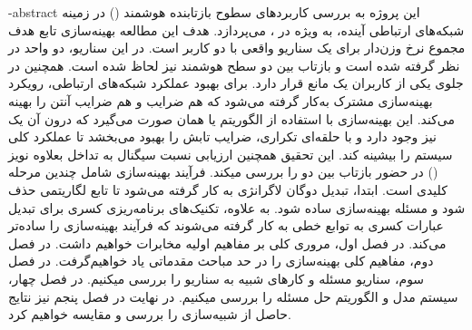 
\fa-abstract{
این پروژه به بررسی کاربرد‌های سطوح بازتابنده هوشمند () در زمینه شبکه‌های ارتباطی آینده، به ویژه در ، می‌پردازد. هدف این مطالعه بهینه‌سازی تابع هدف مجموع نرخ وزن‌دار برای یک سناریو واقعی با دو کاربر است. در این سناریو، دو واحد  در نظر گرفته شده است و بازتاب بین دو سطح هوشمند نیز لحاظ شده است. همچنین در جلوی یکی از کاربران یک مانع قرار دارد. برای بهبود عملکرد شبکه‌های ارتباطی، رویکرد بهینه‌سازی مشترک به‌کار گرفته می‌شود که هم ضرایب  و هم ضرایب آنتن را بهینه می‌کند. این بهینه‌سازی با استفاده از الگوریتم  یا همان  صورت می‌گیرد که درون آن یک  نیز وجود دارد و با حلقه‌ای تکراری، ضرایب تابش را بهبود می‌بخشد تا عملکرد کلی سیستم را بیشینه کند. این تحقیق همچنین ارزیابی نسبت سیگنال به تداخل بعلاوه نویز () در حضور بازتاب بین دو  را بررسی میکند. فرآیند بهینه‌سازی شامل چندین مرحله کلیدی است. ابتدا، تبدیل دوگان لاگرانژی به کار گرفته می‌شود تا تابع لگاریتمی حذف شود و مسئله بهینه‌سازی ساده شود. به علاوه، تکنیک‌های برنامه‌ریزی کسری برای تبدیل عبارات کسری به توابع خطی به کار گرفته می‌شوند که فرآیند بهینه‌سازی را ساده‌تر می‌کند.
در فصل اول، مروری کلی بر مفاهیم اولیه مخابرات خواهیم داشت.
در فصل دوم، مفاهیم کلی بهینه‌سازی را در حد مباحث مقدماتی یاد خواهیم‌گرفت.
در فصل سوم، سناریو مسئله و کارهای شبیه به سناریو را بررسی میکنیم.
در فصل چهار، سیستم مدل و الگوریتم حل مسئله را بررسی میکنیم.
در نهایت در فصل پنجم نیز نتایج حاصل از شبیه‌سازی را بررسی و مقایسه خواهیم کرد.
}

